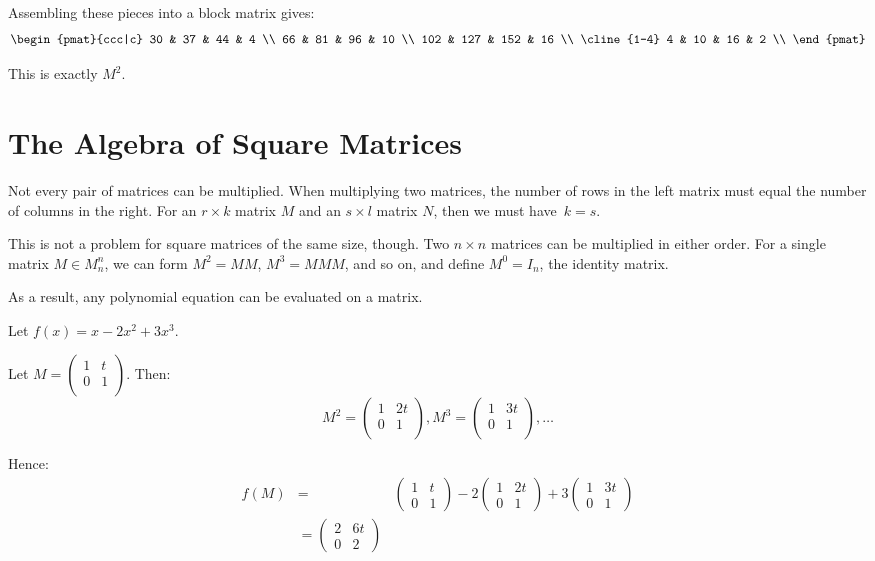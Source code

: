 \begin{itemize}
Assembling these pieces into a block matrix gives:
\[
\begin{pmat}{ccc|c}
30 & 37 & 44 & 4 \\
66 & 81 & 96 & 10 \\
102 & 127 & 152 & 16 \\
\cline{1-4}
4 & 10 & 16 & 2 \\
\end{pmat}
\]

This is exactly $M^2$.
\end{itemize}

\section{The Algebra of Square Matrices }

Not every pair of matrices can be multiplied.  When multiplying two matrices, the number of rows in the left matrix must equal the number of columns in the right.  For an $r\times k$ matrix $M$ and an $s\times l$ matrix $N$, then we must have~$k=s$.

This is not a problem for square matrices of the same size, though.  Two $n\times n$ matrices can be multiplied in either order.  For a single matrix $M \in M^n_n$, we can form $M^2=MM$, $M^3=MMM$, and so on, and define $M^0=I_n$, the identity matrix.

As a result, any polynomial equation can be evaluated on a matrix.

\begin{example}
Let $f(x) = x - 2x^2 + 3x^3$.

Let $M=\begin{pmatrix}
1 & t \\
0 & 1 \\
\end{pmatrix}$.  Then:
\[
M^2 = \begin{pmatrix}
1 & 2t \\
0 & 1 \\
\end{pmatrix},
M^3 = \begin{pmatrix}
1 & 3t \\
0 & 1 \\
\end{pmatrix}, \ldots
\]

Hence:
\begin{align*}
f(M) &=& \begin{pmatrix}
	1 & t \\
	0 & 1
	\end{pmatrix} 
- 2 \begin{pmatrix}
	1 & 2t \\
	0 & 1
	\end{pmatrix} 
+ 3 \begin{pmatrix}
	1 & 3t \\
	0 & 1
	\end{pmatrix} \\
&= \begin{pmatrix}
	2 & 6t \\
	0 & 2
	\end{pmatrix}
\end{align*}
\end{example}

